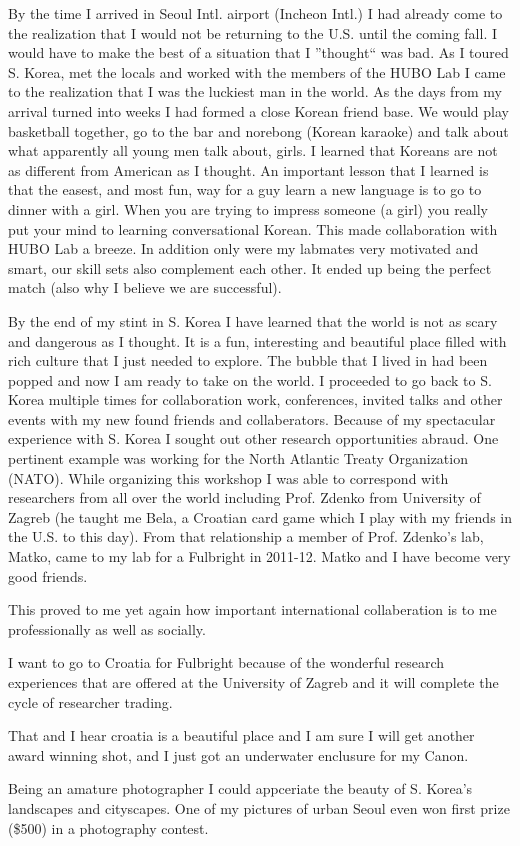 \documentclass[12pt]{article}
\begin{document}
	By the time I arrived in Seoul Intl. airport (Incheon Intl.) I had already come to the realization that I would not be returning to the U.S. until the coming fall.  
I would have to make the best of a situation that I ''thought`` was bad.  
As I toured S. Korea, met the locals and worked with the members of the HUBO Lab I came to the realization that I was the luckiest man in the world. 
 As the days from my arrival turned into weeks I had formed a close Korean friend base.
We would play basketball together, go to the bar and norebong (Korean karaoke) and talk about what apparently all young men talk about, girls.  
I learned that Koreans are not as different from American as I thought.
An important lesson that I learned is that the easest, and most fun, way for a guy learn a new language is to go to dinner with a girl.
When you are trying to impress someone (a girl) you really put your mind to learning conversational Korean.  
This made collaboration with HUBO Lab a breeze.  
In addition only were my labmates very motivated and smart, our skill sets also complement each other.  
It ended up being the perfect match (also why I believe we are successful).  



By the end of my stint in S. Korea I have learned that the world is not as scary and dangerous as I thought.
It is a fun, interesting and beautiful place filled with rich culture that I just needed to explore.
The bubble that I lived in had been popped and now I am ready to take on the world.  
I proceeded to go back to S. Korea multiple times for collaboration work, conferences, invited talks and other events with my new found friends and collaberators.  
Because of my spectacular experience with S. Korea I sought out other research opportunities abraud.  
One pertinent example was working for the North Atlantic Treaty Organization (NATO).
While organizing this workshop I was able to correspond with researchers from all over the world including Prof. Zdenko from University of Zagreb (he taught me Bela, a Croatian card game which I play with my friends in the U.S. to this day).  
From that relationship a member of Prof. Zdenko’s lab, Matko, came to my lab for a Fulbright in 2011-12.  
Matko and I have become very good friends.

This proved to me yet again how important international collaberation is to me professionally as well as socially.



I want to go to Croatia for Fulbright because of the wonderful research experiences that are offered at the University of Zagreb and it will complete the cycle of researcher trading.  

That and I hear croatia is a beautiful place and I am sure I will get another award winning shot, and I just got an underwater enclusure for my Canon\texttrademark.

Being an amature photographer I could appceriate the beauty of S. Korea's  landscapes and cityscapes.
One of my pictures of urban Seoul even won first prize (\$500) in a photography contest. 
\end{document}
